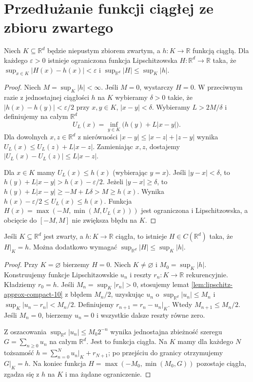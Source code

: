 \section{Przedłużanie funkcji ciągłej ze zbioru zwartego}

\begin{lemat}
\label{lem:lipschitz-approx-compact-10}
Niech $K\subseteq\mathbb R^d$ będzie niepustym
zbiorem zwartym, a $h:K\to\mathbb R$ funkcją ciągłą.
Dla każdego $\varepsilon>0$ istnieje ograniczona
funkcja Lipschitzowska $H:\mathbb R^d\to\mathbb R$
taka, że
$\sup_{x\in K}|H(x)-h(x)|<\varepsilon$
i $\sup_{\mathbb R^d}|H|\le\sup_K|h|$.
\end{lemat}
\begin{proof}
Niech $M=\sup_K|h|<\infty$. Jeśli $M=0$,
wystarczy $H=0$. W przeciwnym razie z jednostajnej
ciągłości $h$ na $K$ wybieramy $\delta>0$ takie, że
$|h(x)-h(y)|<\varepsilon/2$ przy
$x,y\in K$, $|x-y|<\delta$.
Wybieramy $L>2M/\delta$ i definiujemy na
całym $\mathbb R^d$
\[
U_L(x)=\inf_{y\in K}\bigl(h(y)+L|x-y|\bigr).
\]
Dla dowolnych $x,z\in\mathbb R^d$ z nierówności
$|x-y|\le|x-z|+|z-y|$ wynika
$U_L(x)\le U_L(z)+L|x-z|$. Zamieniając $x,z$,
dostajemy $|U_L(x)-U_L(z)|\le L|x-z|$.

Dla $x\in K$ mamy $U_L(x)\le h(x)$ (wybierając
$y=x$). Jeśli $|y-x|<\delta$, to
$h(y)+L|x-y|>h(x)-\varepsilon/2$.
Jeżeli $|y-x|\ge\delta$, to
$h(y)+L|x-y|\ge-M+L\delta>M\ge h(x)$.
Wynika $h(x)-\varepsilon/2\le U_L(x)\le h(x)$.
Funkcja
$H(x)=\max(-M,\min(M,U_L(x)))$
jest ograniczona i Lipschitzowska, a obcięcie do
$[-M,M]$ nie zwiększa błędu na $K$.
\end{proof}

\begin{twierdzenie}
\label{thm:compact-extension-10}
Jeśli $K\subseteq\mathbb R^d$ jest zwarty,
a $h:K\to\mathbb R$ ciągła, to istnieje
$H\in C(\mathbb R^d)$ taka, że $H|_K=h$.
Można dodatkowo wymagać
$\sup_{\mathbb R^d}|H|\le\sup_K|h|$.
\end{twierdzenie}
\begin{proof}
Przy $K=\varnothing$ bierzemy $H=0$.
Niech $K\ne\varnothing$ i $M_0=\sup_K|h|$.
Konstruujemy funkcje Lipschitzowskie $u_n$ i
reszty $r_n:K\to\mathbb R$ rekurencyjnie.
Kładziemy $r_0=h$. Jeśli
$M_n=\sup_K|r_n|>0$, stosujemy lemat
\ref{lem:lipschitz-approx-compact-10} z błędem
$M_n/2$, uzyskując $u_n$ o
$\sup_{\mathbb R^d}|u_n|\le M_n$ i
$\sup_K|u_n-r_n|<M_n/2$.
Definiujemy $r_{n+1}=r_n-u_n|_K$.
Wtedy $M_{n+1}\le M_n/2$. Jeśli $M_n=0$,
bierzemy $u_n=0$ i wszystkie dalsze reszty
równe zero.

Z oszacowania
$\sup_{\mathbb R^d}|u_n|\le M_0 2^{-n}$
wynika jednostajna zbieżność szeregu
$G=\sum_{n\ge0}u_n$ na całym $\mathbb R^d$.
Jest to funkcja ciągła. Na $K$ mamy dla każdego
$N$ tożsamość
$h=\sum_{n=0}^Nu_n|_K+r_{N+1}$;
po przejściu do granicy otrzymujemy $G|_K=h$.
Na koniec funkcja $H=\max(-M_0,\min(M_0,G))$
pozostaje ciągła, zgadza się z $h$ na $K$
i ma żądane ograniczenie.
\end{proof}

